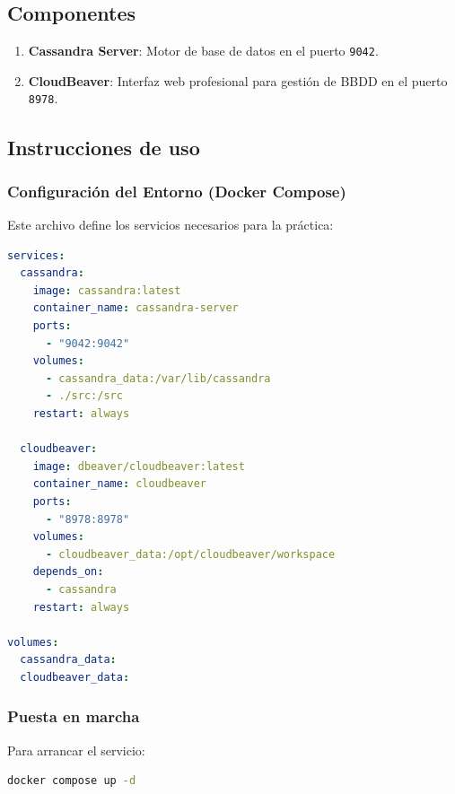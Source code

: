 \documentclass[12pt,a4paper]{article}
\begin{document}
\subsection{Componentes}\label{componentes}

\begin{enumerate}
    \item \textbf{Cassandra Server}: Motor de base de datos en el puerto \texttt{9042}.
    \item \textbf{CloudBeaver}: Interfaz web profesional para gestión de BBDD en el puerto \texttt{8978}.
\end{enumerate}

\subsection{Instrucciones de uso}\label{instrucciones-de-uso}

\subsubsection{Configuración del Entorno (Docker Compose)}\label{configuracion-del-entorno}

Este archivo define los servicios necesarios para la práctica:

\begin{lstlisting}[language=YAML]
services:
  cassandra:
    image: cassandra:latest
    container_name: cassandra-server
    ports:
      - "9042:9042"
    volumes:
      - cassandra_data:/var/lib/cassandra
      - ./src:/src
    restart: always

  cloudbeaver:
    image: dbeaver/cloudbeaver:latest
    container_name: cloudbeaver
    ports:
      - "8978:8978"
    volumes:
      - cloudbeaver_data:/opt/cloudbeaver/workspace
    depends_on:
      - cassandra
    restart: always

volumes:
  cassandra_data:
  cloudbeaver_data:
\end{lstlisting}

\subsubsection{Puesta en marcha}\label{puesta-en-marcha}

Para arrancar el servicio:

\begin{lstlisting}[language=bash]
docker compose up -d
\end{lstlisting}
\end{document}
